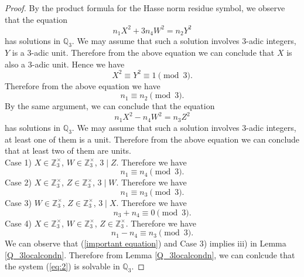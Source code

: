 \documentclass[11pt]{article}
\newcommand{\Q}{ {\mathbb{Q}} }
\begin{document}
\begin{proof}
By the product formula for the Hasse norm residue symbol, we observe that the equation
$$n_{1}X^{2}+3n_{4}W^{2}=n_{2}Y^{2}$$
has solutions in $\mathbb{\Q}_{3}$. We may assume that such a solution involves $3$-adic integers, $Y$ is a $3$-adic unit. Therefore from the above equation we can conclude that $X$ is also a $3$-adic unit. Hence we have 
$$X^{2}\equiv Y^{2}\equiv 1\pmod{3}.$$
Therefore from the above equation we have
\begin{equation}\label{important equation}
n_{1}\equiv n_{2}\pmod{3}.  
\end{equation}
By the same argument, we can conclude that the equation
$$n_{1}X^{2}-n_{4}W^{2}=n_{3}Z^{2}$$
has solutions in $\mathbb{\Q}_{3}$. We may assume that such a solution involves $3$-adic integers, at least one of them is a unit. Therefore from the above equation we can conclude that at least two of them are units.\\

\noindent Case 1) $X\in \mathbb{Z}_{3}^\times$, $W\in \mathbb{Z}_{3}^\times$, $3\mid Z$. Therefore we have
$$n_{1}\equiv n_{4}\pmod{3}.$$
\noindent Case 2) $X\in \mathbb{Z}_{3}^\times$, $Z\in \mathbb{Z}_{3}^\times$, $3\mid W$. Therefore we have
$$n_{1}\equiv n_{3}\pmod{3}.$$
\noindent Case 3) $W\in \mathbb{Z}_{3}^\times$, $Z\in \mathbb{Z}_{3}^\times$, $3\mid X$. Therefore we have
$$n_{3}+n_{4}\equiv 0\pmod{3}.$$
\noindent Case 4) $X\in \mathbb{Z}_{3}^\times$, $W\in \mathbb{Z}_{3}^\times$, $Z\in \mathbb{Z}_{3}^\times$. Therefore we have
$$n_{1}-n_{4}\equiv n_{3}\pmod{3}.$$
We can observe that (\ref{important equation}) and Case 3) implies iii) in Lemma \ref{Q_3localcondn}. Therefore from Lemma  \ref{Q_3localcondn}, we can conlcude that the system (\ref{eq:2}) is solvable in $\mathbb{\Q}_{3}$.
\end{proof}
\end{document}
